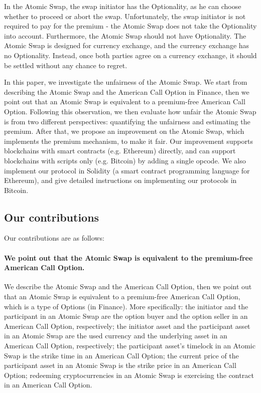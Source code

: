 In the Atomic Swap, the swap initiator has the Optionality, as he can choose whether to proceed or abort the swap.
Unfortunately, the swap initiator is not required to pay for the premium - the Atomic Swap does not take the Optionality into account.
Furthermore, the Atomic Swap should not have Optionality.
The Atomic Swap is designed for currency exchange, and the currency exchange has no Optionality.
Instead, once both parties agree on a currency exchange, it should be settled without any chance to regret.

In this paper, we investigate the unfairness of the Atomic Swap.
We start from describing the Atomic Swap and the American Call Option in Finance,
then we point out that an Atomic Swap is equivalent to a premium-free American Call Option.
Following this observation, we then evaluate how unfair the Atomic Swap is from two different perspectives:
quantifying the unfairness and estimating the premium.
After that, we propose an improvement on the Atomic Swap, which implements the premium mechanism, to make it fair.
Our improvement supports blockchains with smart contracts (e.g. Ethereum) directly, and can support blockchains with scripts only (e.g. Bitcoin) by adding a single opcode.
We also implement our protocol in Solidity (a smart contract programming language for Ethereum), and give detailed instructions on implementing our protocols in Bitcoin.

\subsection{Our contributions}

Our contributions are as follows:

\paragraph{We point out that the Atomic Swap is equivalent to the premium-free American Call Option.}
We describe the Atomic Swap and the American Call Option,
then we point out that an Atomic Swap is equivalent to a premium-free American Call Option, which is a type of Options (in Finance).
More specifically:
the initiator and the participant in an Atomic Swap are the option buyer and the option seller in an American Call Option, respectively;
the initiator asset and the participant asset in an Atomic Swap are the used currency and the underlying asset in an American Call Option, respectively;
the participant asset's timelock in an Atomic Swap is the strike time in an American Call Option;
the current price of the participant asset in an Atomic Swap is the strike price in an American Call Option;
redeeming cryptocurrencies in an Atomic Swap is exercising the contract in an American Call Option.

